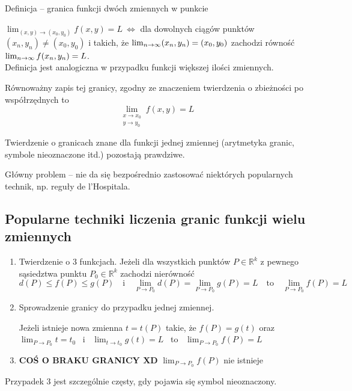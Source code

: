 \begin{tw}{Definicja -- granica funkcji dwóch zmiennych w punkcie}

$ \lim_{(x,y) \to (x_0,y_0)} f(x,y) = L \ \Leftrightarrow $ dla dowolnych ciągów punktów $ (x_n, y_n) \neq (x_0, y_0) $
i takich, że $ \lim_{n \to \infty} (x_n, y_n) = (x_0, y_0) $ zachodzi równość $ \lim_{n \to \infty} f(x_n, y_n) = L $. \\

Definicja jest analogiczna w przypadku funkcji większej ilości zmiennych.

Równoważny zapis tej granicy, zgodny ze znaczeniem twierdzenia o zbieżności po współrzędnych to
$$ \lim_{\substack{x \to x_0 \\ y \to y_0}} f(x,y) = L $$

Twierdzenie o granicach znane dla funkcji jednej zmiennej (arytmetyka granic, symbole nieoznaczone itd.) pozostają prawdziwe.
\end{tw}

Główny problem -- nie da się bezpośrednio zastosować niektórych popularnych technik, np. reguły de l'Hospitala.

\subsection{Popularne techniki liczenia granic funkcji wielu zmiennych}

\begin{enumerate}
    \item Twierdzenie o 3 funkcjach. Jeżeli dla wszystkich punktów $ P \in \mathbb{R}^k $ z pewnego sąsiedztwa punktu
    $ P_0 \in \mathbb{R}^k $ zachodzi nierówność 
    $$ d(P) \leq f(P) \leq g(P) \quad \textrm{i} \quad \lim_{P \to P_0} d(P) = \lim_{P \to P_0} g(P) = L \quad \textrm{to} \quad \lim_{P \to P_0} f(P) = L $$

    \item Sprowadzenie granicy do przypadku jednej zmiennej.
    
    Jeżeli istnieje nowa zmienna $ t = t(P) $ takie, że $ f(P) = g(t) $ oraz 
    $ \lim_{P \to P_0} t = t_0 $ \ i \linebreak \ $ \lim_{t \to t_0} g(t) = L $ \ to \ $ \lim_{P \to P_0} f(P) = L $ 

    \item \textbf{COŚ O BRAKU GRANICY XD}
    $ \lim_{P \to P_0} f(P) $ nie istnieje
\end{enumerate}

Przypadek 3 jest szczególnie częsty, gdy pojawia się symbol nieoznaczony.

